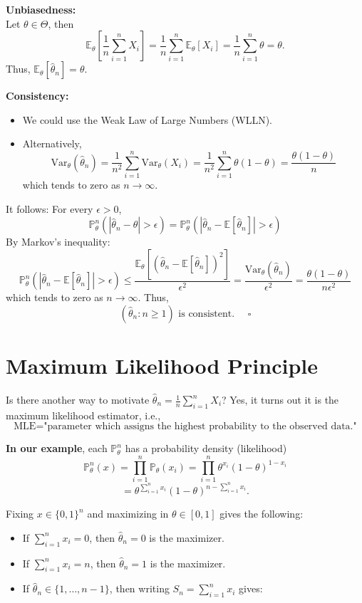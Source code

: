 \documentclass[open=any, 11pt,paper=A4]{scrreprt}
\begin{document}
\textbf{Unbiasedness:} \\
Let $\theta \in \Theta$, then
\[
    \mathbb{E}_\theta \left[ \frac{1}{n} \sum_{i=1}^{n} X_i \right] = \frac{1}{n} \sum_{i=1}^{n} \mathbb{E}_\theta [X_i] = \frac{1}{n} \sum_{i=1}^{n} \theta = \theta.
\]
Thus, $\mathbb{E}_\theta [\hat{\theta}_n] = \theta$.

\textbf{Consistency:}
\begin{itemize}
    \item We could use the Weak Law of Large Numbers (WLLN).
    \item Alternatively,
\[
    \text{Var}_\theta(\hat{\theta}_n) = \frac{1}{n^2} \sum_{i=1}^{n} \text{Var}_\theta (X_i) = \frac{1}{n^2} \sum_{i=1}^{n} \theta (1-\theta) = \frac{\theta(1-\theta)}{n}
\]
which tends to zero as $n \to \infty$.
\end{itemize}

It follows: For every $\epsilon > 0$,
\[
    \mathbb{P}^n_\theta(|\hat{\theta}_n - \theta| > \epsilon) = \mathbb{P}^n_\theta(|\hat{\theta}_n - \mathbb{E}[\hat{\theta}_n]| > \epsilon)
\]
By Markov's inequality:
\[
    \mathbb{P}^n_\theta(|\hat{\theta}_n - \mathbb{E}[\hat{\theta}_n]| > \epsilon) \leq \frac{\mathbb{E}_\theta \left[ (\hat{\theta}_n - \mathbb{E}[\hat{\theta}_n])^2 \right]}{\epsilon^2} = \frac{\text{Var}_\theta (\hat{\theta}_n)}{\epsilon^2} = \frac{\theta(1-\theta)}{n \epsilon^2}
\]
which tends to zero as $n \to \infty$. Thus,
\[
    (\hat{\theta}_n : n \geq 1) \text{ is consistent. } \quad \square
\]

\section{Maximum Likelihood Principle}

Is there another way to motivate $\hat{\theta}_n = \frac{1}{n} \sum_{i=1}^{n} X_i$? Yes, it turns out it is the maximum likelihood estimator, i.e.,
\[
    \text{MLE} = \text{"parameter which assigns the highest probability to the observed data."}
\]

\textbf{In our example}, each $\mathbb{P}_\theta^n$ has a probability density (likelihood)
\[
    \mathbb{P}_\theta^n(x) = \prod_{i=1}^{n} \mathbb{P}_\theta(x_i) = \prod_{i=1}^{n} \theta^{x_i} (1-\theta)^{1-x_i}
\]
\[
    = \theta^{\sum_{i=1}^{n} x_i} (1-\theta)^{n-\sum_{i=1}^{n} x_i}.
\]

Fixing $x \in \{0,1\}^{n}$ and maximizing in $\theta \in [0,1]$ gives the following:

\begin{itemize}
    \item If $\sum_{i=1}^{n} x_i = 0$, then $\hat{\theta}_n = 0$ is the maximizer.
    \item If $\sum_{i=1}^{n} x_i = n$, then $\hat{\theta}_n = 1$ is the maximizer.
    \item If $\hat{\theta}_n \in \{1, \ldots, n-1\}$, then writing $S_n = \sum_{i=1}^{n} x_i$ gives:
\end{itemize}
\end{document}
